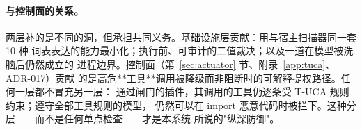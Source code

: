 \paragraph{与控制面的关系。}
两层补的是不同的洞，但承担共同义务。基础设施层贡献：用与宿主扫描器同一套 10 种
词表表达的能力最小化；执行前、可审计的二值裁决；以及一道在模型被洗脑后仍然成立的
进程边界。控制面（第~\ref{sec:actuator} 节、附录~\ref{app:tuca}、ADR-017）贡献
的是高危**工具**调用被降级而非阻断时的可解释提权路径。任何一层都不冒充另一层：
通过闸门的插件，其调用的工具仍逐条受 T-UCA 规则约束；遵守全部工具规则的模型，
仍然可以在 import 恶意代码时被拦下。这种分层——而不是任何单点检查——才是本系统
所说的"纵深防御"。
